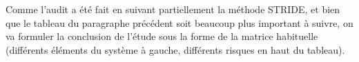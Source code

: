 Comme l'audit a été fait en suivant partiellement la méthode STRIDE, et bien que le tableau du paragraphe précédent soit beaucoup plus important à suivre, on va formuler la conclusion de l'étude sous la forme de la matrice habituelle (différents éléments du système à gauche, différents risques en haut du tableau).